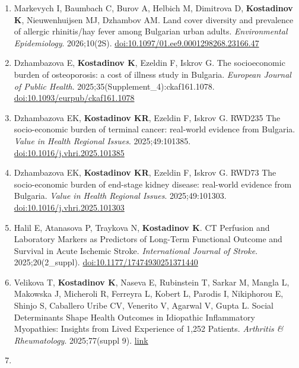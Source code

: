 \documentclass[
  10.5pt,
  a4paper,
  DIV=11,
  numbers=noendperiod]{scrartcl}
\begin{document}
\begin{enumerate}
\def\labelenumi{\arabic{enumi}.}
\setcounter{enumi}{52}
\item
  Markevych I, Baumbach C, Burov A, Helbich M, Dimitrova D,
  \textbf{Kostadinov K}, Nieuwenhuijsen MJ, Dzhambov AM. Land cover
  diversity and prevalence of allergic rhinitis/hay fever among
  Bulgarian urban adults. \emph{Environmental Epidemiology}.
  2026;10(2S).
  \href{https://doi.org/10.1097/01.ee9.0001298268.23166.47}{doi:10.1097/01.ee9.0001298268.23166.47}
\item
  Dzhambazova E, \textbf{Kostadinov K}, Ezeldin F, Iskrov G. The
  socioeconomic burden of osteoporosis: a cost of illness study in
  Bulgaria. \emph{European Journal of Public Health}.
  2025;35(Supplement\_4):ckaf161.1078.
  \href{https://doi.org/10.1093/eurpub/ckaf161.1078}{doi:10.1093/eurpub/ckaf161.1078}
\item
  Dzhambazova EK, \textbf{Kostadinov KR}, Ezeldin F, Iskrov G. RWD235
  The socio-economic burden of terminal cancer: real-world evidence from
  Bulgaria. \emph{Value in Health Regional Issues}. 2025;49:101385.
  \href{https://doi.org/10.1016/j.vhri.2025.101385}{doi:10.1016/j.vhri.2025.101385}
\item
  Dzhambazova EK, \textbf{Kostadinov KR}, Ezeldin F, Iskrov G. RWD73 The
  socio-economic burden of end-stage kidney disease: real-world evidence
  from Bulgaria. \emph{Value in Health Regional Issues}. 2025;49:101303.
  \href{https://doi.org/10.1016/j.vhri.2025.101303}{doi:10.1016/j.vhri.2025.101303}
\item
  Halil E, Atanasova P, Traykova N, \textbf{Kostadinov K}. CT Perfusion
  and Laboratory Markers as Predictors of Long-Term Functional Outcome
  and Survival in Acute Ischemic Stroke. \emph{International Journal of
  Stroke}. 2025;20(2\_suppl).
  \href{https://doi.org/10.1177/17474930251371440}{doi:10.1177/17474930251371440}
\item
  Velikova T, \textbf{Kostadinov K}, Naseva E, Rubinstein T, Sarkar M,
  Mangla L, Makowska J, Micheroli R, Ferreyra L, Kobert L, Parodis I,
  Nikiphorou E, Shinjo S, Caballero Uribe CV, Venerito V, Agarwal V,
  Gupta L. Social Determinants Shape Health Outcomes in Idiopathic
  Inflammatory Myopathies: Insights from Lived Experience of 1,252
  Patients. \emph{Arthritis \& Rheumatology}. 2025;77(suppl 9).
  \href{https://acrabstracts.org/abstract/social-determinants-shape-health-outcomes-in-idiopathic-inflammatory-myopathies-insights-from-lived-experience-of-1252-patients/}{link}
\item

\end{enumerate}
\end{document}
